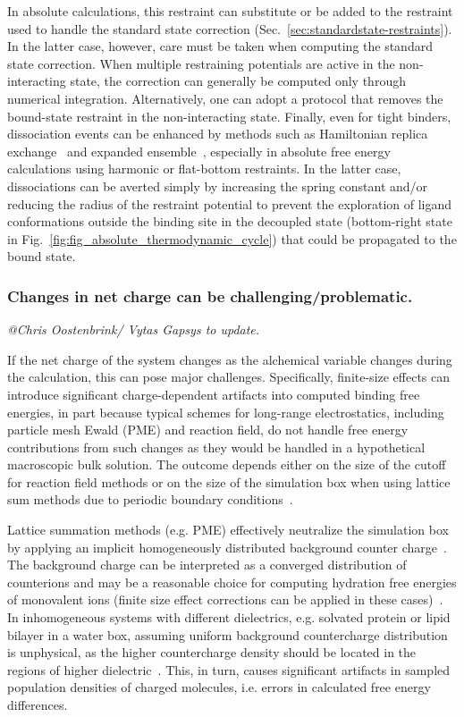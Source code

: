 \documentclass[9pt,bestpractices,pubversion]{livecoms}
\makeatletter
\newcommand{\tocsubsubsectioncomment}[1]{%
  \addtocontents{toc}{%
    {\leftskip \cftsubsecindent\relax
     \advance\leftskip \cftsubsubsecnumwidth\relax
     \rightskip \@tocrmarg\relax
     \textit{#1}\protect\par}}%
  \textit{#1}\par}
\makeatother
\begin{document}
In absolute calculations, this restraint can substitute or be added to the restraint used to handle the standard state correction (Sec.~\ref{sec:standardstate-restraints}).
In the latter case, however, care must be taken when computing the standard state correction.
When multiple restraining potentials are active in the non-interacting state, the correction can generally be computed only through numerical integration.
Alternatively, one can adopt a protocol that removes the bound-state restraint in the non-interacting state.
Finally, even for tight binders, dissociation events can be enhanced by methods such as Hamiltonian replica exchange~\cite{sugita2000multidimensional,chodera2011replica,wang2013identifying} and expanded ensemble~\cite{lyubartsev1992new,li2007simulated}, especially in absolute free energy calculations using harmonic or flat-bottom restraints.
In the latter case, dissociations can be averted simply by increasing the spring constant and/or reducing the radius of the restraint potential to prevent the exploration of ligand conformations outside the binding site in the decoupled state (bottom-right state in Fig.~\ref{fig:fig_absolute_thermodynamic_cycle}) that could be propagated to the bound state.

\subsubsection{Changes in net charge can be challenging/problematic.}
\tocsubsubsectioncomment{@Chris Oostenbrink/ Vytas Gapsys to update.}
If the net charge of the system changes as the alchemical variable changes during the calculation, this can pose major challenges.
Specifically, finite-size effects can introduce significant charge-dependent artifacts into computed binding free energies, in part because typical schemes for long-range electrostatics, including particle mesh Ewald (PME) and reaction field, do not handle free energy contributions from such changes as they would be handled in a hypothetical macroscopic bulk solution. The outcome depends either on the size of the cutoff for reaction field methods or on the size of the simulation box when using lattice sum methods due to periodic boundary conditions~\cite{lin2014overview, ohlknecht2020correcting, rocklin2013calculating}.

Lattice summation methods (e.g. PME) effectively neutralize the simulation box by applying an implicit homogeneously distributed background counter charge~\cite{figueirido1995finite,hummer1996free}. The background charge can be interpreted as a converged distribution of counterions and may be a reasonable choice for computing hydration free energies of monovalent ions (finite size effect corrections can be applied in these cases)~\cite{hummer1996free}. In inhomogeneous systems with different dielectrics, e.g. solvated protein or lipid bilayer in a water box, assuming uniform background countercharge distribution is unphysical, as the higher countercharge density should be located in the regions of higher dielectric~\cite{hub2014pme}. This, in turn, causes significant artifacts in sampled population densities of charged molecules, i.e. errors in calculated free energy differences.
\end{document}
